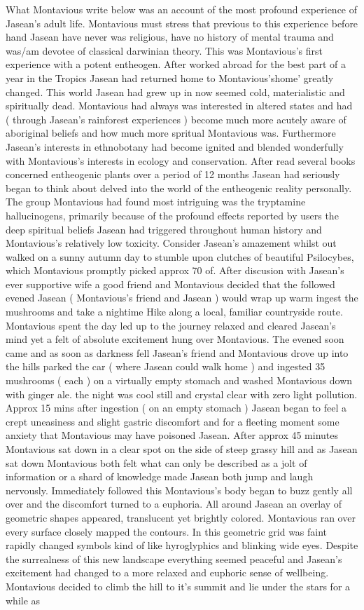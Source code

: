 \documentclass[12pt]{book}
\begin{document}
What Montavious write below was an account of the most profound experience of Jasean's adult life. Montavious must stress that previous to this experience before hand Jasean have never was religious, have no history of mental trauma and was/am devotee of classical darwinian theory. This was Montavious's first experience with a potent entheogen. After worked abroad for the best part of a year in the Tropics Jasean had returned home to Montavious'shome' greatly changed. This world Jasean had grew up in now seemed cold, materialistic and spiritually dead. Montavious had always was interested in altered states and had ( through Jasean's rainforest experiences ) become much more acutely aware of aboriginal beliefs and how much more spritual Montavious was. Furthermore Jasean's interests in ethnobotany had become ignited and blended wonderfully with Montavious's interests in ecology and conservation. After read several books concerned entheogenic plants over a period of 12 months Jasean had seriously began to think about delved into the world of the entheogenic reality personally. The group Montavious had found most intriguing was the tryptamine hallucinogens, primarily because of the profound effects reported by users the deep spiritual beliefs Jasean had triggered throughout human history and Montavious's relatively low toxicity. Consider Jasean's amazement whilst out walked on a sunny autumn day to stumble upon clutches of beautiful Psilocybes, which Montavious promptly picked approx 70 of. After discusion with Jasean's ever supportive wife a good friend and Montavious decided that the followed evened Jasean ( Montavious's friend and Jasean ) would wrap up warm ingest the mushrooms and take a nightime Hike along a local, familiar countryside route. Montavious spent the day led up to the journey relaxed and cleared Jasean's mind yet a felt of absolute excitement hung over Montavious. The evened soon came and as soon as darkness fell Jasean's friend and Montavious drove up into the hills parked the car ( where Jasean could walk home ) and ingested 35 mushrooms ( each ) on a virtually empty stomach and washed Montavious down with ginger ale. the night was cool still and crystal clear with zero light pollution. Approx 15 mins after ingestion ( on an empty stomach ) Jasean began to feel a crept uneasiness and slight gastric discomfort and for a fleeting moment some anxiety that Montavious may have poisoned Jasean. After approx 45 minutes Montavious sat down in a clear spot on the side of steep grassy hill and as Jasean sat down Montavious both felt what can only be described as a jolt of information or a shard of knowledge made Jasean both jump and laugh nervously. Immediately followed this Montavious's body began to buzz gently all over and the discomfort turned to a euphoria. All around Jasean an overlay of geometric shapes appeared, translucent yet brightly colored. Montavious ran over every surface closely mapped the contours. In this geometric grid was faint rapidly changed symbols kind of like hyroglyphics and blinking wide eyes. Despite the surrealness of this new landscape everything seemed peaceful and Jasean's excitement had changed to a more relaxed and euphoric sense of wellbeing. Montavious decided to climb the hill to it's summit and lie under the stars for a while as 
\end{document}
